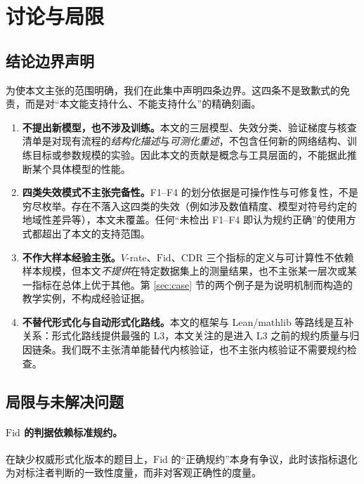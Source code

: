 \section{讨论与局限}\label{sec:limits}

\subsection{结论边界声明}

为使本文主张的范围明确，我们在此集中声明四条边界。这四条不是致歉式的免责，而是对“本文能支持什么、不能支持什么”的精确刻画。

\begin{enumerate}[leftmargin=2.2em, itemsep=2pt]
  \item \textbf{不提出新模型，也不涉及训练。}本文的三层模型、失效分类、验证梯度与核查清单是对现有流程的\emph{结构化描述}与\emph{可测化重述}，不包含任何新的网络结构、训练目标或参数规模的实验。因此本文的贡献是概念与工具层面的，不能据此推断某个具体模型的性能。
  \item \textbf{四类失效模式不主张完备性。}F1--F4 的划分依据是可操作性与可修复性，不是穷尽枚举。存在不落入这四类的失效（例如涉及数值精度、模型对符号约定的地域性差异等），本文未覆盖。任何“未检出 F1--F4 即认为规约正确”的使用方式都超出了本文的支持范围。
  \item \textbf{不作大样本经验主张。}$V$-rate、$\mathrm{Fid}$、$\mathrm{CDR}$ 三个指标的定义与可计算性不依赖样本规模，但本文\emph{不提供}在特定数据集上的测量结果，也不主张某一层次或某一指标在总体上优于其他。第 \ref{sec:case} 节的两个例子是为说明机制而构造的教学实例，不构成经验证据。
  \item \textbf{不替代形式化与自动形式化路线。}本文的框架与 Lean/mathlib 等路线是互补关系：形式化路线提供最强的 L3，本文关注的是进入 L3 之前的规约质量与归因链条。我们既不主张清单能替代内核验证，也不主张内核验证不需要规约检查。
\end{enumerate}

\subsection{局限与未解决问题}

\paragraph{$\mathrm{Fid}$ 的判据依赖标准规约。}在缺少权威形式化版本的题目上，$\mathrm{Fid}$ 的“正确规约”本身有争议，此时该指标退化为对标注者判断的一致性度量，而非对客观正确性的度量。

